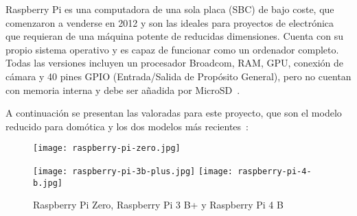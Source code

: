 Raspberry Pi es una computadora de una sola placa (SBC) de bajo coste, que comenzaron a venderse en 2012 y son las ideales para proyectos de electrónica que requieran de una máquina potente de reducidas dimensiones. Cuenta con su propio sistema operativo y es capaz de funcionar como un ordenador completo. Todas las versiones incluyen un procesador Broadcom, RAM, GPU, conexión de cámara y 40 pines GPIO (Entrada/Salida de Propósito General), pero no cuentan con memoria interna y debe ser añadida por MicroSD~\cite{noauthor_raspberry_2021}.

A continuación se presentan las valoradas para este proyecto, que son el modelo reducido para domótica y los dos modelos más recientes~\cite{noauthor_raspberry_nodate}:
\begin{figure}[!htb]
	\texttt{[image: raspberry-pi-zero.jpg]}
	\caption{Raspberry Pi Zero, Raspberry Pi 3 B+ y Raspberry Pi 4 B}
	\endminipage\hfill
	\texttt{[image: raspberry-pi-3b-plus.jpg]}
	\endminipage\hfill
	\texttt{[image: raspberry-pi-4-b.jpg]}
	\endminipage\label{fig:fotosRaspberry}
\end{figure}
